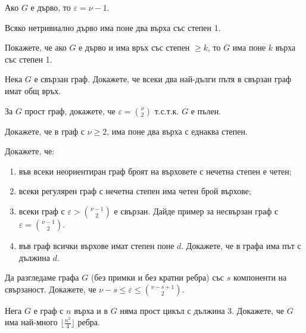 \begin{thm}
  Ако $G$ е дърво, то $\varepsilon = \nu - 1$.
\end{thm}

\begin{crl}
  Всяко нетривиално дърво има поне два върха със степен 1.
\end{crl}

\begin{problem}
  Покажете, че ако $G$ е дърво и има връх със степен $\geq k$, то $G$ има поне $k$ върха със степен 1.
\end{problem}

\begin{problem}
  Нека $G$ е свързан граф.
  Докажете, че всеки два най-дълги пътя в свързан граф имат общ връх.
\end{problem}

\begin{problem}
  За $G$ прост граф, докажете, че $\varepsilon = \binom{\nu}{2}$ т.с.т.к. $G$ е пълен.
\end{problem}

\begin{problem}
  Докажете, че в граф с $\nu\geq 2$, има поне два върха с еднаква степен.
\end{problem}

\begin{problem}
  Докажете, че:
  \begin{enumerate}
  \item
    във всеки неориентиран граф броят на върховете с нечетна степен е четен;
  \item
    всеки регулярен граф с нечетна степен има четен брой върхове;
  \item
    всеки граф с $\varepsilon > \binom{\nu-1}{2}$ е свързан.
    Дайде пример за несвързан граф с $\varepsilon = \binom{\nu-1}{2}$.
  \item
    във граф всички върхове имат степен поне $d$.
    Докажете, че в графа има път с дължина $d$.
  \end{enumerate}
\end{problem}


\begin{problem} %
  Да разгледаме графа $G$ (без примки и без кратни ребра) със $s$ компоненти на свързаност.
  Докажете, че $\nu - s \leq \varepsilon \leq \binom{\nu-s+1}{2}$.
\end{problem}

\begin{problem}
  Нега $G$ е граф с $n$ върха и в $G$ няма прост цикъл с дължина 3.
  Докажете, че $G$ има най-много $\lfloor{\frac{n^2}{4}}\rfloor$ ребра.
\end{problem}


